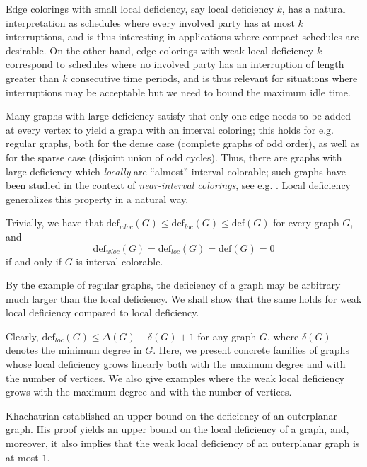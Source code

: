 \documentclass[12pt]{article}
\theoremstyle{plain}
\theoremstyle{definition}
\numberwithin{equation}{section}
\begin{document}
Edge colorings with small local deficiency, say local deficiency $k$, has a natural interpretation as schedules
where every involved party has at most $k$ interruptions, 
and is thus interesting in applications where compact schedules
are desirable. On the other hand, edge colorings with weak local deficiency $k$
correspond to schedules where no involved party has an interruption of length
greater than $k$ consecutive time periods, and is thus relevant for situations
where  interruptions may be acceptable but we need to bound the maximum
idle time.

Many graphs with large deficiency satisfy that only one edge needs to be added at every vertex
to yield a graph with an interval coloring; this holds for  e.g. regular graphs, both for the dense case
(complete graphs of odd order), as well as for the sparse case (disjoint union of odd cycles).
Thus, there are graphs with large deficiency which {\em locally} are ``almost'' interval colorable;
such graphs have been studied in the context of {\em near-interval colorings},
see e.g.  \cite{CarlJToft, CasselgrenPetrosyan, PetAraBagh, PetrosHranTigran}.
Local deficiency generalizes this property in a natural way.


Trivially, we have that $\mathrm{def}_{wloc}(G) \leq  \mathrm{def}_{loc}(G) \leq \mathrm{def}(G)$ for every graph $G$,
and $$\mathrm{def}_{wloc}(G) =  \mathrm{def}_{loc}(G) = \mathrm{def}(G)=0$$ if and only if $G$ is interval colorable.


By the example of regular graphs, the deficiency of a graph
may be arbitrary much larger than the local deficiency. We shall show that the same
holds for weak local deficiency compared to local deficiency.


Clearly, $\mathrm{def}_{loc}(G) \leq \Delta(G)- \delta(G)+1$ for any graph $G$,
where  $\delta(G)$ denotes the minimum degree in $G$.
Here, we present concrete families of graphs whose local deficiency grows linearly both 
with the maximum degree and
with the number of vertices. We also give examples where the weak local deficiency grows with the maximum degree
and with the number of vertices.


Khachatrian \cite{Hrant} established an upper bound on the deficiency of an outerplanar graph.
His proof  yields an upper bound on the local deficiency of a graph, and, moreover, 
it also implies that the weak local deficiency of an outerplanar graph is at most $1$.
\end{document}
